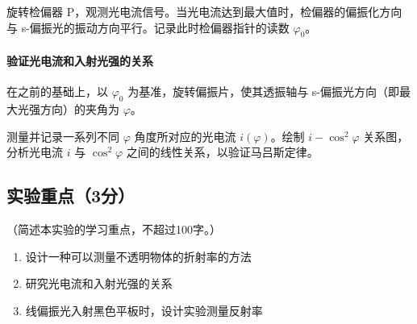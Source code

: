 \documentclass[yuxi]{../template/Report}%
\begin{document}
    旋转检偏器 P，观测光电流信号。当光电流达到最大值时，检偏器的偏振化方向与 s-偏振光的振动方向平行。记录此时检偏器指针的读数 $\varphi_0$。
    \paragraph{验证光电流和入射光强的关系}
    在之前的基础上，以 $\varphi_0$ 为基准，旋转偏振片，使其透振轴与 s-偏振光方向（即最大光强方向）的夹角为 $\varphi$。

    测量并记录一系列不同 $\varphi$ 角度所对应的光电流 $i(\varphi)$。绘制 $i - \cos^2 \varphi$ 关系图，分析光电流 $i$ 与 $\cos^2 \varphi$ 之间的线性关系，以验证马吕斯定律。
\subsection{实验重点（3分）}
（简述本实验的学习重点，不超过100字。）
\begin{enumerate}
    \item 设计一种可以测量不透明物体的折射率的方法
    \item 研究光电流和入射光强的关系
    \item 线偏振光入射黑色平板时，设计实验测量反射率
\end{enumerate}
\end{document}
